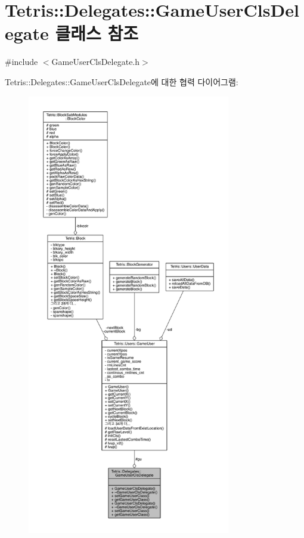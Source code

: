 \hypertarget{class_tetris_1_1_delegates_1_1_game_user_cls_delegate}{}\section{Tetris\+:\+:Delegates\+:\+:Game\+User\+Cls\+Delegate 클래스 참조}
\label{class_tetris_1_1_delegates_1_1_game_user_cls_delegate}


{\ttfamily \#include $<$Game\+User\+Cls\+Delegate.\+h$>$}



Tetris\+:\+:Delegates\+:\+:Game\+User\+Cls\+Delegate에 대한 협력 다이어그램\+:
\nopagebreak
\begin{figure}[H]
\begin{center}
\leavevmode
\includegraphics[height=550pt]{dd/dea/class_tetris_1_1_delegates_1_1_game_user_cls_delegate__coll__graph}
\end{center}
\end{figure}
